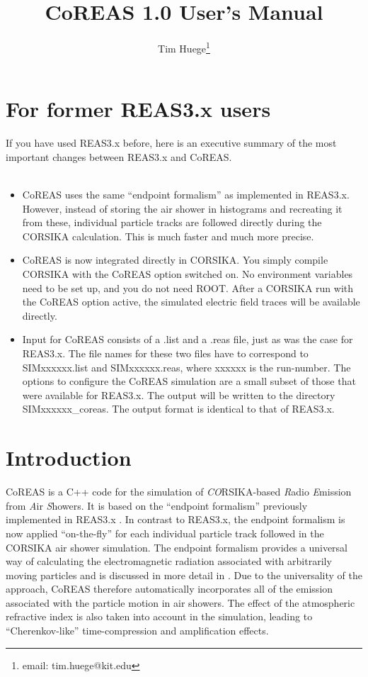 \documentclass[a4paper,10pt]{article}
\title{CoREAS 1.0 User's Manual}
\author{Tim Huege\footnote{email: tim.huege@kit.edu}}
\begin{document}
\maketitle

\section{For former REAS3.x users}

If you have used REAS3.x before, here is an executive summary of the most important changes between REAS3.x and CoREAS.\\ \\

\begin{itemize}
\item{CoREAS uses the same ``endpoint formalism'' as implemented in REAS3.x. However, instead of storing the air shower in histograms and recreating it from these, individual particle tracks are followed directly during the CORSIKA calculation. This is much faster and much more precise.}
\item{CoREAS is now integrated directly in CORSIKA. You simply compile CORSIKA with the CoREAS option switched on. No environment variables need to be set up, and you do not need ROOT. After a CORSIKA run with the CoREAS option active, the simulated electric field traces will be available directly.}
\item{Input for CoREAS consists of a .list and a .reas file, just as was the case for REAS3.x. The file names for these two files have to correspond to SIMxxxxxx.list and SIMxxxxxx.reas, where xxxxxx is the run-number. The options to configure the CoREAS simulation are a small subset of those that were available for REAS3.x. The output will be written to the directory SIMxxxxxx\_coreas. The output format is identical to that of REAS3.x.}
\end{itemize}

\clearpage

\section{Introduction}

CoREAS \citep{HuegeLudwigJames2013} is a C++ code for the simulation of {\em CO}RSIKA-based {\em R}adio {\em E}mission from {\em A}ir {\em S}howers. It is based on the ``endpoint formalism'' previously implemented in REAS3.x \citep{LudwigHuege2010}. In contrast to REAS3.x, the endpoint formalism is now applied ``on-the-fly'' for each individual particle track followed in the CORSIKA air shower simulation. The endpoint formalism provides a universal way of calculating the electromagnetic radiation associated with arbitrarily moving particles and is discussed in more detail in \citep{JamesFalckeHuege2010}. Due to the universality of the approach, CoREAS therefore automatically incorporates all of the emission associated with the particle motion in air showers. The effect of the atmospheric refractive index is also taken into account in the simulation, leading to ``Cherenkov-like'' time-compression and amplification effects.
\end{document}
